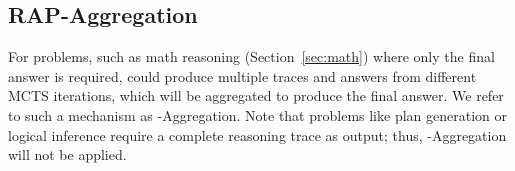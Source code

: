 \subsection{RAP-Aggregation} \label{sec:aggr}


For problems, such as math reasoning (Section~\ref{sec:math}) where only the final answer is required, \ours could produce multiple traces and answers from different MCTS iterations, which will be aggregated to produce the final answer. We refer to such a mechanism as \ours-Aggregation. Note that problems like plan generation or logical inference require a complete reasoning trace as output; thus, \ours-Aggregation will not be applied.




